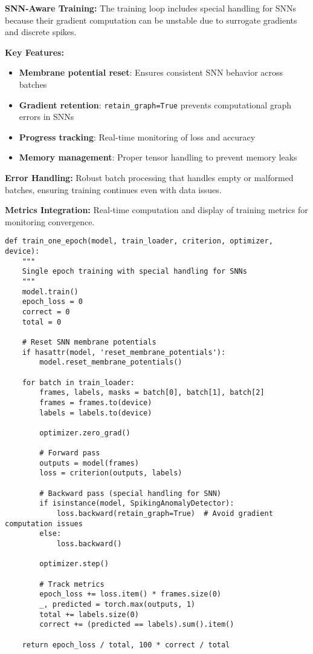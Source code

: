 \documentclass[12pt,a4paper]{article}
\begin{document}
\textbf{SNN-Aware Training:} The training loop includes special handling for SNNs because their gradient computation can be unstable due to surrogate gradients and discrete spikes.

\textbf{Key Features:}
\begin{itemize}
    \item \textbf{Membrane potential reset}: Ensures consistent SNN behavior across batches
    \item \textbf{Gradient retention}: \texttt{retain\_graph=True} prevents computational graph errors in SNNs
    \item \textbf{Progress tracking}: Real-time monitoring of loss and accuracy
    \item \textbf{Memory management}: Proper tensor handling to prevent memory leaks
\end{itemize}

\textbf{Error Handling:} Robust batch processing that handles empty or malformed batches, ensuring training continues even with data issues.

\textbf{Metrics Integration:} Real-time computation and display of training metrics for monitoring convergence.

\begin{lstlisting}[caption={Training Loop with SNN Support - Robust Multi-Architecture Training}]
def train_one_epoch(model, train_loader, criterion, optimizer, device):
    """
    Single epoch training with special handling for SNNs
    """
    model.train()
    epoch_loss = 0
    correct = 0
    total = 0
    
    # Reset SNN membrane potentials
    if hasattr(model, 'reset_membrane_potentials'):
        model.reset_membrane_potentials()
    
    for batch in train_loader:
        frames, labels, masks = batch[0], batch[1], batch[2]
        frames = frames.to(device)
        labels = labels.to(device)
        
        optimizer.zero_grad()
        
        # Forward pass
        outputs = model(frames)
        loss = criterion(outputs, labels)
        
        # Backward pass (special handling for SNN)
        if isinstance(model, SpikingAnomalyDetector):
            loss.backward(retain_graph=True)  # Avoid gradient computation issues
        else:
            loss.backward()
        
        optimizer.step()
        
        # Track metrics
        epoch_loss += loss.item() * frames.size(0)
        _, predicted = torch.max(outputs, 1)
        total += labels.size(0)
        correct += (predicted == labels).sum().item()
    
    return epoch_loss / total, 100 * correct / total
\end{lstlisting}
\end{document}
